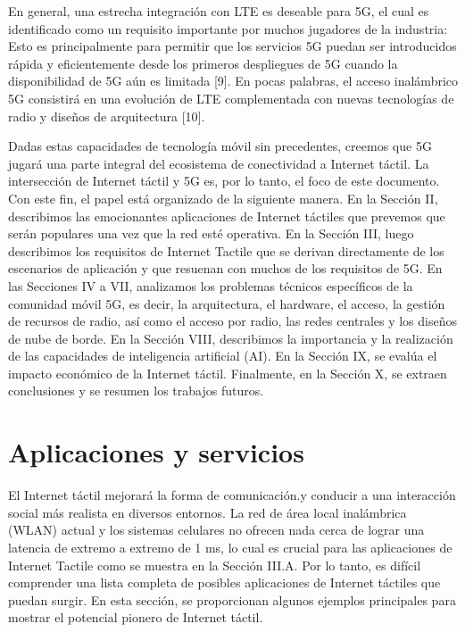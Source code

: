 \documentclass[12pt,journal,compsoc]{IEEEtran}
\begin{document}
En general, una estrecha integración con LTE es deseable para 5G, el cual es identificado como un requisito importante por muchos jugadores de la industria: Esto es principalmente para permitir que los servicios 5G puedan ser introducidos rápida y eficientemente desde los primeros despliegues de 5G cuando la disponibilidad de 5G aún es limitada [9]. En pocas palabras, el acceso inalámbrico 5G consistirá en una evolución de LTE complementada con nuevas tecnologías de radio y diseños de arquitectura [10].

Dadas estas capacidades de tecnología móvil sin precedentes, creemos que 5G jugará una parte integral del ecosistema de conectividad a Internet táctil. La intersección de Internet táctil y 5G es, por lo tanto, el foco de este documento. Con este fin, el papel está organizado de la siguiente manera. En la Sección II, describimos las emocionantes aplicaciones de Internet táctiles que prevemos que serán populares una vez que la red esté operativa. En la Sección III, luego describimos los requisitos de Internet Tactile que se derivan directamente de los escenarios de aplicación y que resuenan con muchos de los requisitos de 5G. En las Secciones IV a VII, analizamos los problemas técnicos específicos de la comunidad móvil 5G, es decir, la arquitectura, el hardware, el acceso, la gestión de recursos de radio, así como el acceso por radio, las redes centrales y los diseños de nube de borde. En la Sección VIII, describimos la importancia y la realización de las capacidades de inteligencia artificial (AI). En la Sección IX, se evalúa el impacto económico de la Internet táctil. Finalmente, en la Sección X, se extraen conclusiones y se resumen los trabajos futuros.

\section{Aplicaciones y servicios}

El Internet táctil mejorará la forma de comunicación.y conducir a una interacción social más realista en diversos entornos. La red de área local inalámbrica (WLAN) actual y los sistemas celulares no ofrecen nada cerca de lograr una latencia de extremo a extremo de 1 ms, lo cual es crucial para las aplicaciones de Internet Tactile como se muestra en la Sección III.A. Por lo tanto, es difícil comprender una lista completa de posibles aplicaciones de Internet táctiles que puedan surgir. En esta sección, se proporcionan algunos ejemplos principales para mostrar el potencial pionero de Internet táctil.
\end{document}
